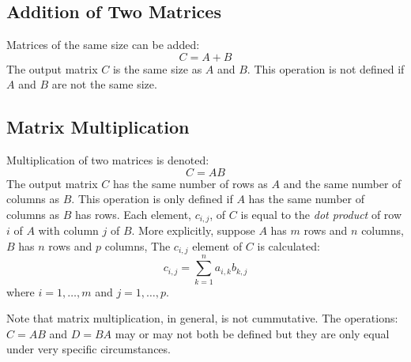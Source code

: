 \subsection{Addition of Two Matrices}
Matrices of the same size can be added:
\begin{equation*}
C = A + B
\end{equation*}
The output matrix $C$ is the same size as $A$ and $B$.  This operation is not defined if $A$ and $B$ are not the same size.

\subsection{Matrix Multiplication}
Multiplication of two matrices is denoted:
\begin{equation*}
C = AB
\end{equation*}
The output matrix $C$ has the same number of rows as $A$ and the same number of columns as $B$.  This operation is only defined if $A$ has the same number of columns as $B$ has rows.  Each element, $c_{i,j}$, of $C$ is equal to the \emph{dot product} of row $i$ of $A$ with column $j$ of $B$.  More explicitly, suppose $A$ has $m$ rows and $n$ columns, $B$ has $n$ rows and $p$ columns, The $c_{i,j}$ element of $C$ is calculated:
\begin{equation*}
c_{i,j} = \sum\limits_{k=1}^{n} a_{i,k}b_{k,j}
\end{equation*}
where $i=1,\dots,m$ and $j=1,\dots,p$.

Note that matrix multiplication, in general, is not cummutative.  The operations: $C = AB$ and $D=BA$ may or may not both be defined but they are only equal under very specific circumstances.

